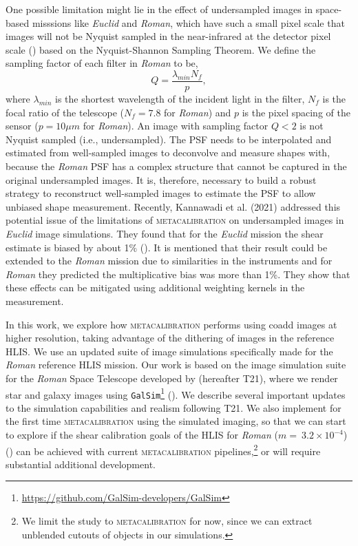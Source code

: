 \documentclass[fleqn,usenatbib]{mnras}
\begin{document}
One possible limitation might lie in the effect of undersampled images in space-based misssions like \emph{Euclid} and \emph{Roman}, which have such a small pixel scale that images will not be Nyquist sampled in the near-infrared at the detector pixel scale (\citealt{2013PASP..125.1496S}) based on the Nyquist-Shannon Sampling Theorem. We define the sampling factor of each filter in \emph{Roman} to be, 
\begin{equation}
    Q = \frac{\lambda_{min}N_{f}}{p}, 
    \label{eqn:sampling}
\end{equation}
where $\lambda_{min}$ is the shortest wavelength of the incident light in the filter, $N_{f}$ is the focal ratio of the telescope ($N_{f}=7.8$ for \emph{Roman}) and $p$ is the pixel spacing of the sensor ($p=10\mu m$ for \emph{Roman}). An image with sampling factor $Q < 2$ is not Nyquist sampled (i.e., undersampled). The PSF needs to be interpolated and estimated from well-sampled images to deconvolve and measure shapes with, because the \emph{Roman} PSF has a complex structure that cannot be captured in the original undersampled images. It is, therefore, necessary to build a robust strategy to reconstruct well-sampled images to estimate the PSF to allow unbiased shape measurement.
Recently, Kannawadi et al. (2021) addressed this potential issue of the limitations of \textsc{metacalibration} on undersampled images in \emph{Euclid} image simulations. They found that for the \emph{Euclid} mission the shear estimate is biased by about 1$\%$ (\citealt{2021MNRAS.502.4048K}). It is mentioned that their result could be extended to the \emph{Roman} mission due to similarities in the instruments and for \emph{Roman} they predicted the multiplicative bias was more than 1\%. They show that these effects can be mitigated using additional weighting kernels in the measurement. 

In this work, we explore how \textsc{metacalibration} performs using coadd images at higher resolution, taking advantage of the dithering of images in the reference HLIS. We use an updated suite of image simulations specifically made for the \emph{Roman} reference HLIS mission. Our work is based on the image simulation suite for the \emph{Roman} Space Telescope developed by \cite{2021MNRAS.501.2044T} (hereafter T21), where we render star and galaxy images using \texttt{GalSim}\footnote{\url{ https://github.com/GalSim-developers/GalSim}} (\citealt{2015A&C....10..121R}). We describe several important updates to the simulation capabilities and realism following T21. We also implement for the first time \textsc{metacalibration} using the simulated imaging, so that we can start to explore if the shear calibration goals of the HLIS for \emph{Roman} ($m=~3.2\times10^{-4}$) (\citealt{2018arXiv180403628D}) can be achieved with current \textsc{metacalibration} pipelines,\footnote{We limit the study to \textsc{metacalibration} for now, since we can extract unblended cutouts of objects in our simulations.} or will require substantial additional development. \par
\end{document}
